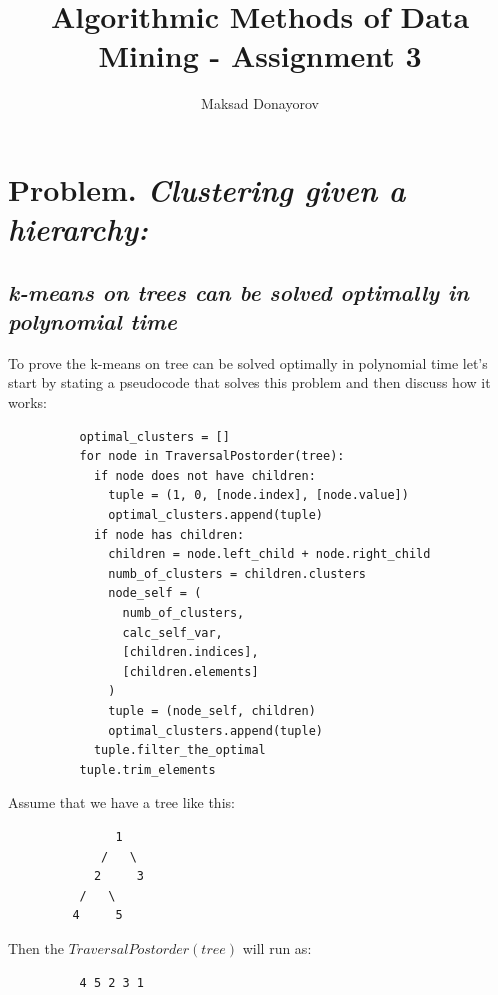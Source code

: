 \documentclass[11pt,a4paper,english]{article}
\title{Algorithmic Methods of Data Mining - Assignment 3}
\author{Maksad Donayorov}
\begin{document}
    \maketitle

    \section{Problem. \textit{Clustering given a hierarchy:}}
      \subsection{
        \textit{k-means on trees can be solved optimally in polynomial time}
      }
        To prove the k-means on tree can be solved optimally in polynomial time let's start by stating a pseudocode that solves this problem and then discuss how it works:
        \begin{verbatim}
          optimal_clusters = []
          for node in TraversalPostorder(tree):
            if node does not have children:
              tuple = (1, 0, [node.index], [node.value])
              optimal_clusters.append(tuple)
            if node has children:
              children = node.left_child + node.right_child
              numb_of_clusters = children.clusters
              node_self = (
                numb_of_clusters,
                calc_self_var,
                [children.indices],
                [children.elements]
              )
              tuple = (node_self, children)
              optimal_clusters.append(tuple)
            tuple.filter_the_optimal
          tuple.trim_elements
        \end{verbatim}

        Assume that we have a tree like this:
        \begin{verbatim}
               1
             /   \
            2     3
          /   \
         4     5
        \end{verbatim}
        Then the $TraversalPostorder(tree)$ will run as:
        \begin{verbatim}
          4 5 2 3 1
        \end{verbatim}
\end{document}
